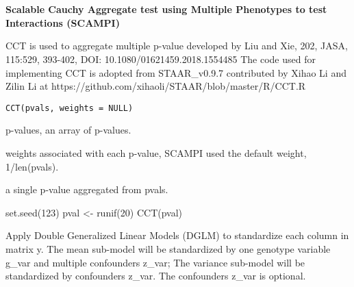 \documentclass[a4paper]{book}
\begin{document}
\chapter*{}
\begin{center}
{\textbf{\huge Scalable Cauchy Aggregate test using Multiple Phenotypes to test Interactions (SCAMPI)}}
\par\bigskip{\large \today}
\end{center}
%
\begin{Description}
CCT is used to aggregate multiple p-value developed by Liu and Xie, 202, JASA, 115:529, 393-402, DOI: 10.1080/01621459.2018.1554485
The code used for implementing CCT is adopted from STAAR\_v0.9.7 contributed by Xihao Li and Zilin Li at
https://github.com/xihaoli/STAAR/blob/master/R/CCT.R
\end{Description}
%
\begin{Usage}
\begin{verbatim}
CCT(pvals, weights = NULL)
\end{verbatim}
\end{Usage}
%
\begin{Arguments}
\begin{ldescription}
\item[\code{pvals}] p-values, an array of p-values.

\item[\code{weights}] weights associated with each p-value, SCAMPI used the default weight, 1/len(pvals).
\end{ldescription}
\end{Arguments}
%
\begin{Value}
a single p-value aggregated from pvals.
\end{Value}
%
\begin{Examples}
\begin{ExampleCode}
set.seed(123)
pval <- runif(20)
CCT(pval)
\end{ExampleCode}
\end{Examples}
%
\begin{Description}
Apply Double Generalized Linear Models (DGLM) to standardize each
column in matrix y. The mean sub-model will be standardized by one genotype variable g\_var and multiple confounders z\_var;
The variance sub-model will be standardized by confounders z\_var. The confounders z\_var is optional.
\end{Description}
\end{document}
